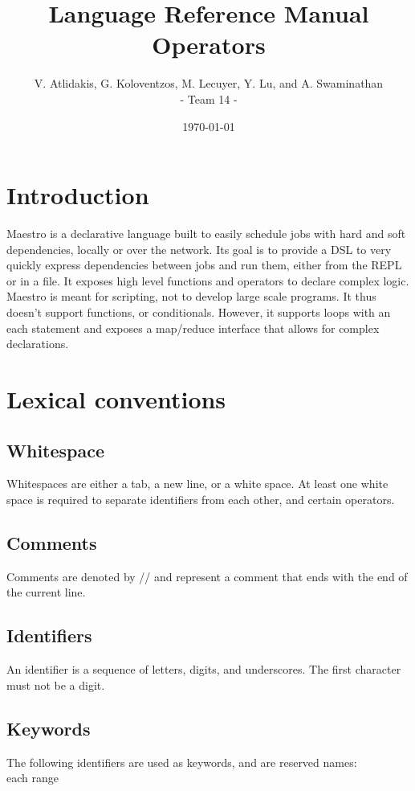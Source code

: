 \documentclass[12pt]{article}
\title{Language Reference Manual Operators}
\author{V. Atlidakis, G. Koloventzos, M. Lecuyer, Y. Lu, and A. Swaminathan \\ - Team 14 -}
\date{\today}
\begin{document}
\maketitle
\tableofcontents
\newpage

\section{Introduction}
Maestro is a declarative language built to easily schedule jobs with hard and
soft dependencies, locally or over the network.  Its goal is to provide a DSL to
very quickly express dependencies between jobs and run them, either from the
REPL or in a file.  It exposes high level functions and operators to declare
complex logic. Maestro is meant for scripting, not to develop large scale
programs. It thus doesn't support functions, or conditionals. However, it
supports loops with an each statement and exposes a map/reduce interface that
allows for complex declarations.

\section{Lexical conventions}
\subsection{Whitespace}
Whitespaces are either a tab, a new line, or a white space. At least one white space is required to separate identifiers from
each other, and certain operators.

\subsection{Comments}
Comments are denoted by // and represent a comment that ends with the end of the current line.

\subsection{Identifiers}
An identifier is a sequence of letters, digits, and underscores. The first character must not be a digit.

\subsection{Keywords}
The following identifiers are used as keywords, and are reserved names:\\
each range
\end{document}
